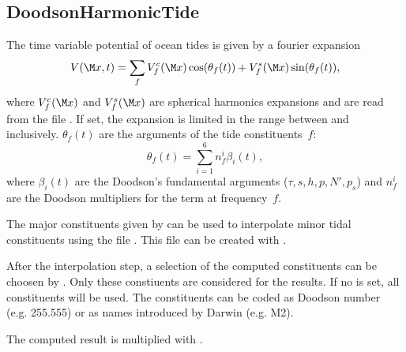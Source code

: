 \subsection{DoodsonHarmonicTide}\label{tidesType:doodsonHarmonicTide}
The time variable potential of ocean tides is given by a fourier expansion
\begin{equation}
V(\M x,t) = \sum_{f} V_f^c(\M x)\cos(\theta_f(t)) + V_f^s(\M x)\sin(\theta_f(t)),
\end{equation}
where $V_f^c(\M x)$ and $V_f^s(\M x)$ are spherical harmonics expansions and are
read from the file .
If set, the expansion is limited in the range between 
and  inclusively.
$\theta_f(t)$ are the arguments of the tide constituents~$f$:
\begin{equation}
\theta_f(t) = \sum_{i=1}^6 n_f^i\beta_i(t),
\end{equation}
where $\beta_i(t)$ are the Doodson's fundamental arguments ($\tau,s,h,p,N',p_s$)
and $n_f^i$ are the Doodson multipliers for the term at frequency~$f$.

The major constituents given by  can be used to
interpolate minor tidal constituents using the file .
This file can be created with .

After the interpolation step, a selection of the computed constituents can be
choosen by . Only these constiuents are considered for the results.
If no  is set, all constituents will be used. The constituents can
be coded as Doodson number (e.g. 255.555) or as names introduced by Darwin (e.g. M2).

The computed result is multiplied with .


